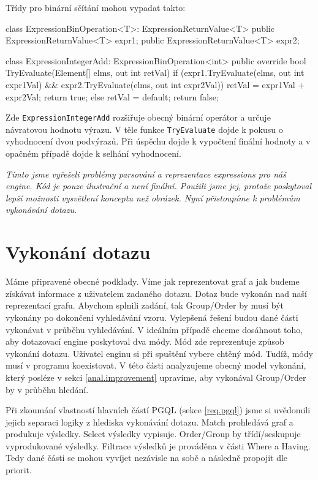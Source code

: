 Třídy pro binární sčítání mohou vypadat takto:
\begin{code}
class ExpressionBinOperation<T>: ExpressionReturnValue<T> {
  public ExpressionReturnValue<T> expr1;
  public ExpressionReturnValue<T> expr2;
}
\end{code}
\begin{code}
class ExpressionIntegerAdd: ExpressionBinOperation<int>{
  public override bool TryEvaluate(Element[] elms, out int retVal) {
    if (expr1.TryEvaluate(elms, out int expr1Val) &&
        expr2.TryEvaluate(elms, out int expr2Val)) {
      retVal = expr1Val + expr2Val;
      return true;
    } else {
      retVal = default;
      return false;
    }
  }
}
\end{code}
Zde \texttt{ExpressionIntegerAdd} rozšiřuje obecný binární operátor a určuje návratovou hodnotu výrazu.
V těle funkce \texttt{TryEvaluate} dojde k pokusu o vyhodnocení dvou podvýrazů.
Při úspěchu dojde k vypočtení finální hodnoty a v opačném případě dojde k selhání vyhodnocení. 

\bigskip
\textit{Tímto jsme vyřešeli problémy parsování a reprezentace expressions pro náš engine.
Kód je pouze ilustrační a není finální.
Použili jsme jej, protože poskytoval lepší možnosti vysvětlení konceptu než obrázek.
Nyní přistoupíme k problémům vykonávání dotazu.}

\clearpage

\section{Vykonání dotazu} \label{anal.vykonanidotazu}

Máme připravené obecné podklady.
Víme jak reprezentovat graf a jak budeme získávat informace z uživatelem zadaného dotazu.
Dotaz bude vykonán nad naší reprezentací grafu.
Abychom splnili zadání, tak Group/Order by musí být vykonány po dokončení vyhledávání vzoru.
Vylepšená řešení budou dané části vykonávat v průběhu vyhledávání.
V ideálním případě chceme dosáhnout toho, aby dotazovací engine poskytoval dva módy.
Mód zde reprezentuje způsob vykonání dotazu.
Uživatel enginu si při spuštění vybere chtěný mód.
Tudíž, módy musí v programu koexistovat.
V této části analyzujeme obecný model vykonání, který posléze v sekci \ref{anal.improvement} upravíme, aby vykonával Group/Order by v průběhu hledání.

Při zkoumání vlastností hlavních částí PGQL (sekce \ref{req.pgql}) jsme si uvědomili jejich separaci logiky z hlediska vykonávání dotazu.
Match prohledává graf a produkuje výsledky. 
Select výsledky vypisuje. 
Order/Group by třídí/seskupuje vyprodukované výsledky.
Filtrace výsledků je prováděna v části Where a Having.
Tedy dané části se mohou vyvíjet nezávisle na sobě a následně propojit dle priorit.

